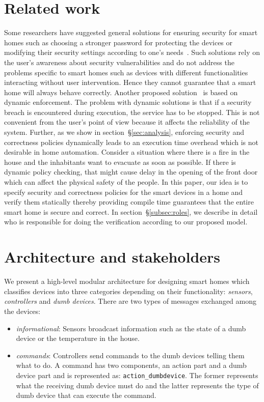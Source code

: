 \documentclass{article}
\begin{document}
\section{Related work}
Some researchers have suggested general solutions for ensuring security for smart homes such as choosing a stronger password for protecting the devices or modifying their security settings according to one's needs~\cite{semantec}. Such solutions rely on the user's awareness about security vulnerabilities and do not address the problems specific to smart homes such as devices with different functionalities interacting without user intervention. Hence they cannot guarantee that a smart home will always behave correctly. Another proposed solution~\cite{al2000secure} is based on dynamic enforcement. The problem with dynamic solutions is that if a security breach is encountered during execution, the service has to be stopped. This is not convenient from the user's point of view because it affects the reliability of the system. Further, as we show in section~\S\ref{sec:analysis}, enforcing security and correctness policies dynamically leads to an execution time overhead which is not desirable in home automation. Consider a situation where there is a fire in the house and the inhabitants want to evacuate as soon as possible. If there is dynamic policy checking, that might cause delay in the opening of the front door which can affect the physical safety of the people. 
In this paper, our idea is to specify security and correctness policies for the smart devices in a home and verify them statically thereby providing compile time guarantees that the entire smart home is secure and correct. In section~\S\ref{subsec:roles}, we describe in detail who is responsible for doing the verification according to our proposed model.

\section{Architecture and stakeholders}
\label{sec:archi}
We present a high-level modular architecture for designing smart homes which classifies devices into three categories depending on their functionality: \textit{sensors}, \textit{controllers} and \textit{dumb devices}. There are two types of messages exchanged among the devices: 
\begin{itemize}[topsep=0pt,itemsep=-1ex,partopsep=1ex,parsep=1ex]
    \item \textit{informational}: Sensors broadcast information such as the state of a dumb device or the temperature in the house.  
    \item \textit{commands}: Controllers send commands to the dumb devices telling them what to do. A command has two components, an action part and a dumb device part and is represented as:   \texttt{action\_dumbdevice}. The former represents what the receiving dumb device must do and the latter represents the type of dumb device that can execute the command.
\end{itemize}
\end{document}
